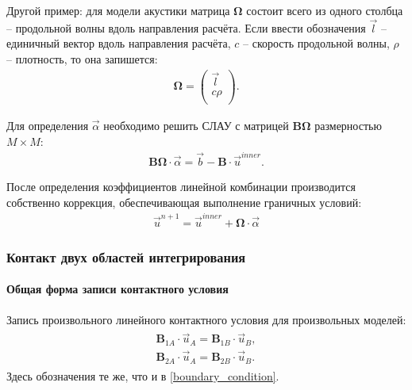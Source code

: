 Другой пример: для модели акустики матрица $\mathbf{\Omega}$ состоит 
всего из одного столбца -- продольной волны вдоль направления расчёта. 
Если ввести обозначения $\vec{l}$ -- единичный вектор вдоль направления расчёта,
$c$ -- скорость продольной волны, $\rho$ -- плотность, то она запишется:
\begin{align}
\label{Omega_for_acoustic}
	\mathbf{\Omega} =
	\left( \begin{array}{cccccccccccc}
	 \vec{l} \\
	 c \rho \\
	\end{array} \right).
\end{align} 

Для определения $\vec{\alpha}$ необходимо решить 
СЛАУ с матрицей $\mathbf{B} \mathbf{\Omega}$ размерностью $M \times M$:
\begin{eqnarray}
\label{SLE_on_alpha}
	\mathbf{B} \mathbf{\Omega} \cdot \vec{\alpha} = \vec{b} - \mathbf{B} \cdot \vec{u}^{inner}.
\end{eqnarray}

После определения коэффициентов линейной комбинации производится собственно коррекция,
обеспечивающая выполнение граничных условий:
\begin{eqnarray}
\vec{u}^{n+1} = \vec{u}^{inner} + \mathbf{\Omega} \cdot \vec{\alpha}
\end{eqnarray}


\subsubsection{Контакт двух областей интегрирования}
\paragraph{Общая форма записи контактного условия}
Запись произвольного линейного контактного условия для произвольных моделей:
\begin{eqnarray}
\label{contact_condition}
\begin{split}
	\mathbf{B}_{1A} \cdot \vec{u}_A = \mathbf{B}_{1B} \cdot \vec{u}_B, \\
	\mathbf{B}_{2A} \cdot \vec{u}_A = \mathbf{B}_{2B} \cdot \vec{u}_B.
\end{split}
\end{eqnarray}
Здесь обозначения те же, что и в \eqref{boundary_condition}.

